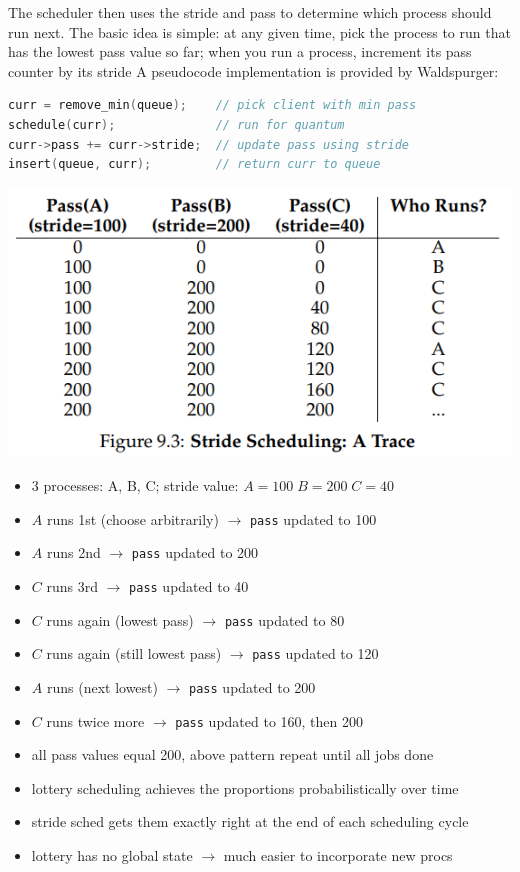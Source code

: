 The scheduler then uses the stride and pass to determine which process should run next. The basic idea is simple: at any given time, pick
the process to run that has the lowest pass value so far; when you run
a process, increment its pass counter by its stride  A pseudocode implementation is provided by Waldspurger:
\begin{lstlisting}[language=c]
curr = remove_min(queue);    // pick client with min pass
schedule(curr);              // run for quantum
curr->pass += curr->stride;  // update pass using stride
insert(queue, curr);         // return curr to queue
\end{lstlisting}
\includegraphics[width=\linewidth]{imgs/sched_stride}
\begin{itemize}
\item 3 processes: A, B, C; stride value: $A = 100\;B = 200\; C=40$
\item $A$ runs 1st (choose arbitrarily) $\to$ \texttt{pass} updated to 100
\item $A$ runs 2nd  $\to$  \texttt{pass} updated to 200
\item $C$ runs 3rd  $\to$  \texttt{pass} updated to 40
\item $C$ runs again (lowest pass)  $\to$  \texttt{pass} updated to 80
\item $C$ runs again (still lowest pass) $\to$ \texttt{pass} updated to 120
\item $A$ runs (next lowest) $\to$  \texttt{pass} updated to 200
\item $C$ runs twice more $\to$ \texttt{pass} updated to 160, then 200
\item all pass values equal 200, above pattern repeat until all jobs done
\item lottery scheduling achieves the proportions probabilistically over time
\item stride sched gets them exactly right at the end of each scheduling cycle
\item lottery has no global state $\to$ much easier to incorporate new procs
\end{itemize}
